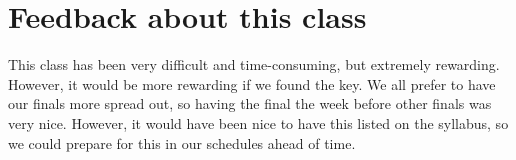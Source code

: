 \documentclass{article}
\begin{document}
\section{Feedback about this class}
This class has been very difficult and time-consuming, but extremely rewarding. However, it would be more rewarding if we found the key. We all prefer to have our finals more spread out, so having the final the week before other finals was very nice. However, it would have been nice to have this listed on the syllabus, so we could prepare for this in our schedules ahead of time.
\end{document}
